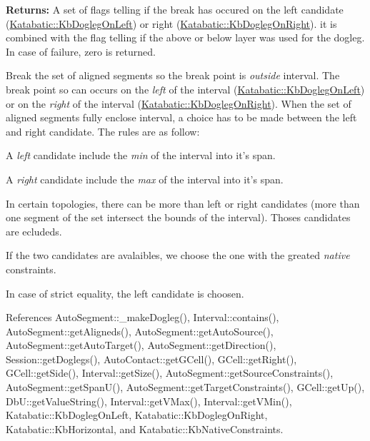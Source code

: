 {\bfseries Returns\-:} A set of flags telling if the break has occured on the left candidate (\hyperlink{namespaceKatabatic_a2af2ad6b6441614038caf59d04b3b217a67bb7c53bbbc73a0e2d1f3f3e16ab679}{Katabatic\-::\-Kb\-Dogleg\-On\-Left}) or right (\hyperlink{namespaceKatabatic_a2af2ad6b6441614038caf59d04b3b217afe7fcb4c332f36e477433169b3d3f515}{Katabatic\-::\-Kb\-Dogleg\-On\-Right}). it is combined with the flag telling if the above or below layer was used for the dogleg. In case of failure, zero is returned.

Break the set of aligned segments so the break point is {\itshape outside} {\ttfamily interval}. The break point so can occurs on the {\itshape left} of the interval (\hyperlink{namespaceKatabatic_a2af2ad6b6441614038caf59d04b3b217a67bb7c53bbbc73a0e2d1f3f3e16ab679}{Katabatic\-::\-Kb\-Dogleg\-On\-Left}) or on the {\itshape right} of the interval (\hyperlink{namespaceKatabatic_a2af2ad6b6441614038caf59d04b3b217afe7fcb4c332f36e477433169b3d3f515}{Katabatic\-::\-Kb\-Dogleg\-On\-Right}). When the set of aligned segments fully enclose {\ttfamily interval}, a choice has to be made between the left and right candidate. The rules are as follow\-:
\begin{DoxyItemize}
\item A {\itshape left} candidate include the {\itshape min} of the interval into it's span.
\item A {\itshape right} candidate include the {\itshape max} of the interval into it's span.
\item In certain topologies, there can be more than left or right candidates (more than one segment of the set intersect the bounds of the interval). Thoses candidates are ecludeds.
\item If the two candidates are avalaibles, we choose the one with the greated {\itshape native} constraints.
\item In case of strict equality, the left candidate is choosen.
\end{DoxyItemize}

 

References Auto\-Segment\-::\-\_\-make\-Dogleg(), Interval\-::contains(), Auto\-Segment\-::get\-Aligneds(), Auto\-Segment\-::get\-Auto\-Source(), Auto\-Segment\-::get\-Auto\-Target(), Auto\-Segment\-::get\-Direction(), Session\-::get\-Doglegs(), Auto\-Contact\-::get\-G\-Cell(), G\-Cell\-::get\-Right(), G\-Cell\-::get\-Side(), Interval\-::get\-Size(), Auto\-Segment\-::get\-Source\-Constraints(), Auto\-Segment\-::get\-Span\-U(), Auto\-Segment\-::get\-Target\-Constraints(), G\-Cell\-::get\-Up(), Db\-U\-::get\-Value\-String(), Interval\-::get\-V\-Max(), Interval\-::get\-V\-Min(), Katabatic\-::\-Kb\-Dogleg\-On\-Left, Katabatic\-::\-Kb\-Dogleg\-On\-Right, Katabatic\-::\-Kb\-Horizontal, and Katabatic\-::\-Kb\-Native\-Constraints.


